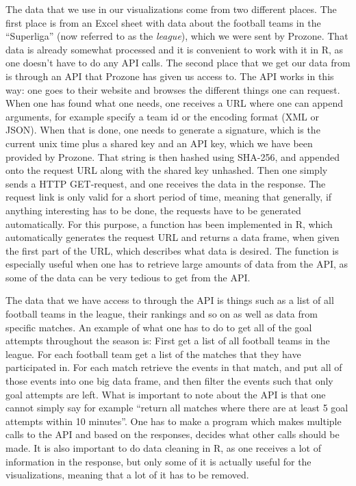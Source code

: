 \documentclass[Report.tex]{subfiles}
\begin{document}
The data that we use in our visualizations come from two different places. The first place is from an Excel sheet with data about the football teams in the ``Superliga'' (now referred to as the \emph{league}), which we were sent by Prozone. That data is already somewhat processed and it is convenient to work with it in R, as one doesn't have to do any API calls. The second place that we get our data from is through an API that Prozone has given us access to. The API works in this way: one goes to their website and browses the different things one can request. When one has found what one needs, one receives a URL where one can append arguments, for example specify a team id or the encoding format (XML or JSON). When that is done, one needs to generate a signature, which is the current unix time plus a shared key and an API key, which we have been provided by Prozone. That string is then hashed using SHA-256, and appended onto the request URL along with the shared key unhashed. Then one simply sends a HTTP GET-request, and one receives the data in the response. The request link is only valid for a short period of time, meaning that generally, if anything interesting has to be done, the requests have to be generated automatically. For this purpose, a function has been implemented in R, which automatically generates the request URL and returns a data frame, when given the first part of the URL, which describes what data is desired. The function is especially useful when one has to retrieve large amounts of data from the API, as some of the data can be very tedious to get from the API. 

The data that we have access to through the API is things such as a list of all football teams in the league, their rankings and so on as well as data from specific matches. An example of what one has to do to get all of the goal attempts throughout the season is: First get a list of all football teams in the league. For each football team get a list of the matches that they have participated in. For each match retrieve the events in that match, and put all of those events into one big data frame, and then filter the events such that only goal attempts are left. What is important to note about the API is that one cannot simply say for example ``return all matches where there are at least 5 goal attempts within 10 minutes''. One has to make a program which makes multiple calls to the API and based on the responses, decides what other calls should be made. It is also important to do data cleaning in R, as one receives a lot of information in the response, but only some of it is actually useful for the visualizations, meaning that a lot of it has to be removed.
\end{document}
